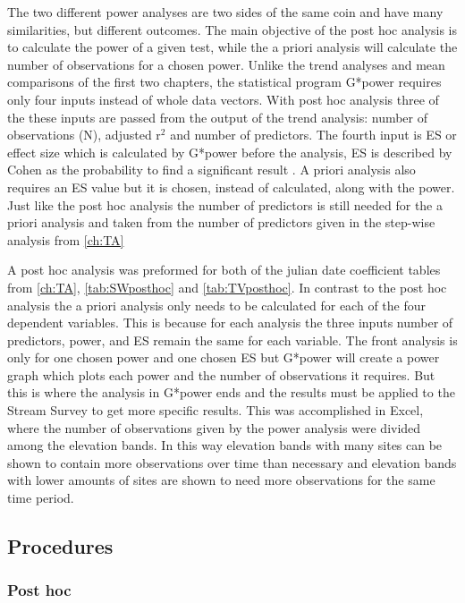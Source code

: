 The two different power analyses are two sides of the same coin and have many similarities, but different outcomes.
The main objective of the post hoc analysis is to calculate the power of a given test, while the a priori analysis will calculate the number of observations for a chosen power.
Unlike the trend analyses and mean comparisons of the first two chapters, the statistical program G*power requires only four inputs instead of whole data vectors.  
With post hoc analysis three of the these inputs are passed from the output of the trend analysis: number of observations (N), adjusted r$^2$ and number of predictors.
The fourth input is ES or effect size which is calculated by G*power before the analysis, ES is described by Cohen as the probability to find a significant result \citep{cohen1992power}.
A priori analysis also requires an ES value but it is chosen, instead of calculated, along with the power.
Just like the post hoc analysis the number of predictors is still needed for the a priori analysis and taken from the number of predictors given in the step-wise analysis from \autoref{ch:TA}

A post hoc analysis was preformed for both of the julian date coefficient tables from \autoref{ch:TA},  \autoref{tab:SWposthoc} and \autoref{tab:TVposthoc}.
In contrast to the post hoc analysis the a priori analysis only needs to be calculated for each of the four dependent variables.
This is because for each analysis the three inputs number of predictors, power, and ES remain the same for each variable.
The front analysis is only for one chosen power and one chosen ES but G*power will create a power graph which plots each power and the number of observations it requires.
But this is where the analysis in G*power ends and the results must be applied to the Stream Survey to get more specific results.
This was accomplished in Excel, where the number of observations given by the power analysis were divided among the elevation bands.
In this way elevation bands with many sites can be shown to contain more observations over time than necessary and elevation bands with lower amounts of sites are shown to need more observations for the same time period.

\subsection{Procedures}

\subsubsection{Post hoc}

